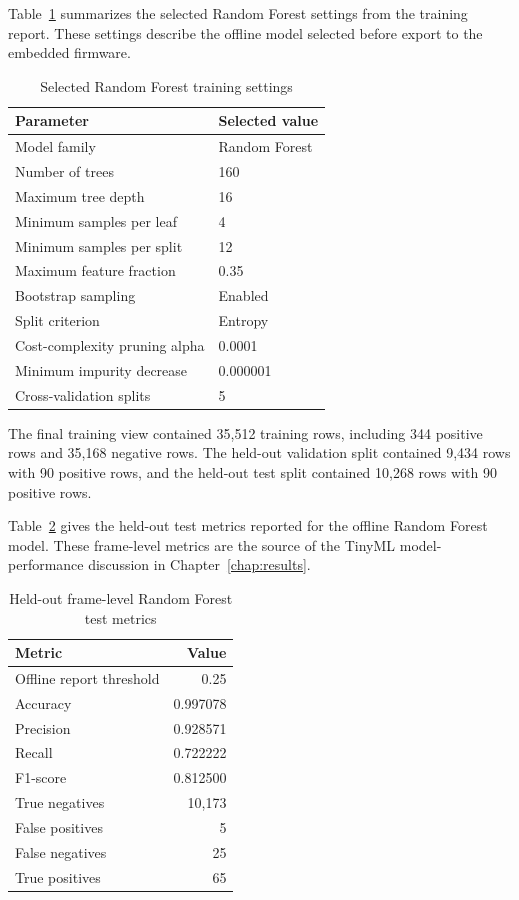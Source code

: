 Table~\ref{tab:app-f-rf-search} summarizes the selected Random Forest settings
from the training report. These settings describe the offline model selected
before export to the embedded firmware.
\begin{table}[H]
  \centering
  \caption{Selected Random Forest training settings}
  \label{tab:app-f-rf-search}
  \begin{tabular}{ll}
    \toprule
    \textbf{Parameter} & \textbf{Selected value} \\
    \midrule
    Model family & Random Forest \\
    Number of trees & 160 \\
    Maximum tree depth & 16 \\
    Minimum samples per leaf & 4 \\
    Minimum samples per split & 12 \\
    Maximum feature fraction & 0.35 \\
    Bootstrap sampling & Enabled \\
    Split criterion & Entropy \\
    Cost-complexity pruning alpha & 0.0001 \\
    Minimum impurity decrease & 0.000001 \\
    Cross-validation splits & 5 \\
    \bottomrule
  \end{tabular}
\end{table}

The final training view contained 35,512 training rows, including 344 positive
rows and 35,168 negative rows. The held-out validation split contained
9,434 rows with 90 positive rows, and the held-out test split contained
10,268 rows with 90 positive rows.

Table~\ref{tab:app-f-rf-test-metrics} gives the held-out test metrics reported
for the offline Random Forest model. These frame-level metrics are the source
of the TinyML model-performance discussion in Chapter~\ref{chap:results}.
\begin{table}[H]
  \centering
  \caption{Held-out frame-level Random Forest test metrics}
  \label{tab:app-f-rf-test-metrics}
  \begin{tabular}{lr}
    \toprule
    \textbf{Metric} & \textbf{Value} \\
    \midrule
    Offline report threshold & 0.25 \\
    Accuracy & 0.997078 \\
    Precision & 0.928571 \\
    Recall & 0.722222 \\
    F1-score & 0.812500 \\
    True negatives & 10,173 \\
    False positives & 5 \\
    False negatives & 25 \\
    True positives & 65 \\
    \bottomrule
  \end{tabular}
\end{table}

